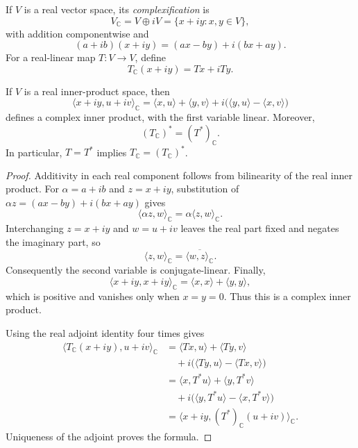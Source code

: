 \begin{definition}[Complexification]
If \(V\) is a real vector space, its \emph{complexification} is
\[
V_{\mathbb C}=V\oplus iV=\{x+iy:x,y\in V\},
\]
with addition componentwise and
\[
(a+ib)(x+iy)=(ax-by)+i(bx+ay).
\]
For a real-linear map \(T:V\to V\), define
\[
T_{\mathbb C}(x+iy)=Tx+iTy.
\]
\end{definition}

\begin{proposition}
\label{prop:complexification-adjoint}
If \(V\) is a real inner-product space, then
\[
\langle x+iy,u+iv\rangle_{\mathbb C}
=\langle x,u\rangle+\langle y,v\rangle
+i\bigl(\langle y,u\rangle-\langle x,v\rangle\bigr)
\]
defines a complex inner product, with the first variable linear.  Moreover,
\[
(T_{\mathbb C})^*=(T^*)_{\mathbb C}.
\]
In particular, \(T=T^*\) implies \(T_{\mathbb C}=(T_{\mathbb C})^*\).
\end{proposition}
\begin{proof}
Additivity in each real component follows from bilinearity of the real inner
product.  For \(\alpha=a+ib\) and \(z=x+iy\), substitution of
\(\alpha z=(ax-by)+i(bx+ay)\) gives
\[
\langle\alpha z,w\rangle_{\mathbb C}
=\alpha\langle z,w\rangle_{\mathbb C}.
\]
Interchanging \(z=x+iy\) and \(w=u+iv\) leaves the real part fixed and
negates the imaginary part, so
\[
\langle z,w\rangle_{\mathbb C}
=\overline{\langle w,z\rangle_{\mathbb C}}.
\]
Consequently the second variable is conjugate-linear.  Finally,
\[
\langle x+iy,x+iy\rangle_{\mathbb C}
=\langle x,x\rangle+\langle y,y\rangle,
\]
which is positive and vanishes only when \(x=y=0\).  Thus this is a complex
inner product.

Using the real adjoint identity four times gives
\[
\begin{aligned}
\langle T_{\mathbb C}(x+iy),u+iv\rangle_{\mathbb C}
&=\langle Tx,u\rangle+\langle Ty,v\rangle\\
&\quad+i\bigl(\langle Ty,u\rangle-\langle Tx,v\rangle\bigr)\\
&=\langle x,T^*u\rangle+\langle y,T^*v\rangle\\
&\quad+i\bigl(\langle y,T^*u\rangle-\langle x,T^*v\rangle\bigr)\\
&=\langle x+iy,(T^*)_{\mathbb C}(u+iv)\rangle_{\mathbb C}.
\end{aligned}
\]
Uniqueness of the adjoint proves the formula.
\end{proof}

